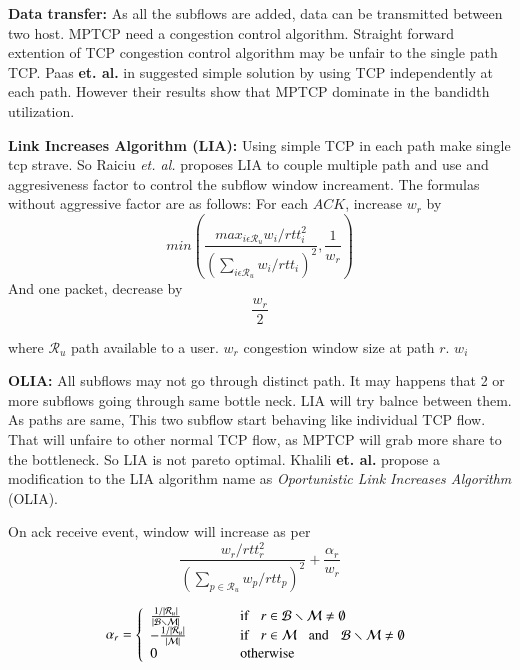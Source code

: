 \textbf{Data transfer:}
As all the subflows are added, data can be transmitted between two host. MPTCP need a congestion control algorithm. Straight forward extention of TCP congestion control algorithm may be unfair to the single path TCP.
Paas \textbf{et. al.} in \cite{PaaschMptcp} suggested simple solution by using TCP independently at each path. However their results show that MPTCP dominate in the bandidth utilization.

\textbf{Link Increases Algorithm (LIA):} Using simple TCP in each path make single tcp strave. So Raiciu \textit{et. al.} proposes LIA to couple multiple path and use and aggresiveness factor to control the subflow window increament\cite{LIARFC6356}. The formulas without aggressive factor are as follows:
For each $ACK$, increase $w_r$ by 
$$min\left( \frac{max_{i\epsilon \mathcal{R}_u} w_i/rtt_i^2}{\left(\sum_{i\epsilon \mathcal{R}_u}w_i/rtt_i\right)^2}, \frac{1}{w_r}\right) $$
And one packet, decrease by $$\frac{w_r}{2}$$

where $\mathcal{R}_u$ path available to a user. $w_r$ congestion window size at path $r$.  $w_i$

\textbf{OLIA:} All subflows may not go through distinct path. It may happens that 2 or more subflows going through same bottle neck. LIA will try balnce between them. As paths are same, This two subflow start behaving like individual TCP flow. That will unfaire to other normal TCP flow, as MPTCP will grab more share to the bottleneck. So LIA is not pareto optimal\cite{OLIARamin2012}. Khalili \textbf{et. al.} propose a modification to the LIA algorithm name as \textit{Oportunistic Link Increases Algorithm} (OLIA).

On ack receive event, window will increase as per
\begin{equation}
\frac{w_r/rtt_r^2}{\left( \sum_{p\in\mathcal{R}_u}w_p/rtt_p\right)^2} + \frac{\alpha_r}{w_r}
\end{equation}

\begin{equation}
    \alpha_r = \left\lbrace 
    \begin{array}{ll}
       \frac{1/|\mathcal{R}_u|}{|\mathcal{B}\smallsetminus \mathcal{M}|}  &\mbox{if} \hspace{0.3cm} r \in \mathcal{B}\smallsetminus\mathcal{M}\neq\emptyset   \\
       - \frac{1/|\mathcal{R}_u|}{|\mathcal{M}|} \hspace{1cm}&\mbox{if} \hspace{0.3cm} r \in \mathcal{M} \hspace{0.3cm}\mbox{and}\hspace{0.3cm}\mathcal{B}\smallsetminus\mathcal{M}\neq \emptyset \\
       0 & \mbox{otherwise}
       \end{array} \right. 
\end{equation}


